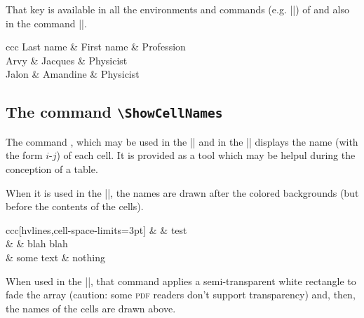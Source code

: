 \documentclass[dvipsnames]{article}
\begin{document}
That key is available in all the environments and commands (e.g.
|\pAutoNiceMatrix|) of  and also in the command
|\NiceMatrixOptions|.

\bigskip
\begin{Code}[width=9cm,show-output,no-cell-nodes]
\begin{NiceTabular}
  {ccc}
\CodeBefore
\Body
  Last name & First name & Profession \\
  Arvy & Jacques & Physicist \\
  Jalon & Amandine & Physicist
\end{NiceTabular}
\end{Code}


\subsection{The command \texttt{\textbackslash ShowCellNames}}



The command , which may be used in the
|\CodeBefore| and in the |\CodeAfter| displays the name (with the form $i$-$j$)
of each cell. It is provided as a tool which may be helpul during the conception of
a table.

\medskip
When it is used in the |\CodeBefore|, the names are drawn after the colored backgrounds
(but before the contents of the cells).

\medskip
\begin{Code}[width=10.6cm,show-output,no-cell-nodes]
\begin{NiceTabular}{ccc}[hvlines,cell-space-limits=3pt]
\CodeBefore
  \emph{\ShowCellNames}
\Body
   &           & test \\
                &           & blah blah \\
                & some text & nothing 
\end{NiceTabular}
\end{Code}

\bigskip
When used in the |\CodeAfter|, that command applies a semi-transparent white
rectangle to fade the array (caution: some \textsc{pdf} readers don't support
transparency) and, then, the names of the cells are drawn above.
\end{document}

